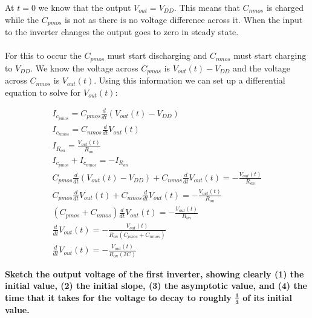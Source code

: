\begin{enumerate}
{  At $t = 0$ we know that the output $V_{out} = V_{DD}$.
  This means that $C_{nmos}$ is charged while the $C_{pmos}$ is not as there is no voltage difference across it.
  When the input to the inverter changes the output goes to zero in steady state.
  \\
  \\
  For this to occur the $C_{pmos}$ must start discharging and $C_{nmos}$ must start charging to $V_{DD}$.
  We know the voltage across $C_{pmos}$ is $V_{out}(t) - V_{DD}$ and the voltage across $C_{nmos}$ is $V_{out}(t)$.
  Using this information we can set up a differential equation to solve for $V_{out}(t)$:

\begin{align*}
  I_{c_{pmos}} = C_{pmos} \frac{d}{dt}(V_{out}(t) - V_{DD}) \\
  I_{c_{nmos}} = C_{nmos} \frac{d}{dt}V_{out}(t) \\
  I_{R_{on}} = \frac{V_{out}(t)}{R_{on}} \\
  I_{c_{pmos}} + I_{c_{nmos}} = -I_{R_{on}} \\
  C_{pmos} \frac {d}{dt} (V_{out}(t) - V_{DD}) + C_{nmos} \frac {d}{dt} V_{out}(t) = - \frac {V_{out}(t)}{R_{on}} \\
  C_{pmos} \frac {d}{dt} V_{out}(t) + C_{nmos} \frac{d}{dt} V_{out}(t) = - \frac {V_{out} (t)} {R_{on}} \\
  (C_{pmos} + C_{nmos}) \frac {d}{dt} V_{out} (t) = - \frac {V_{out}(t)} {R_{on}} \\
  \frac {d}{dt} V_{out}(t) = - \frac {V_{out} (t)} {R_{on} (C_{pmos} + C_{nmos})} \\
  \frac {d}{dt} V_{out} (t) = - \frac {V_{out} (t)} {R_{on} (2C)}
\end{align*}
}



\qitem \textbf{Sketch the output voltage of the first inverter, showing clearly (1) the initial value, (2) the initial slope, (3) the asymptotic value, and (4) the time that it takes for the voltage to decay to roughly $\mathbf{\frac{1}{3}}$ of its initial value.}

\end{enumerate}
